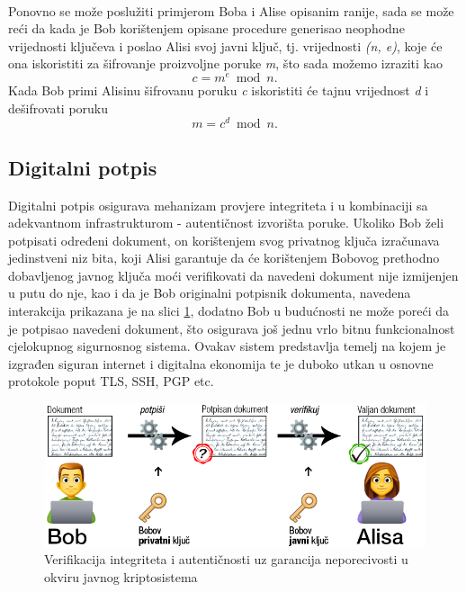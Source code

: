 \paragraph*{}
Ponovno se može poslužiti primjerom Boba i Alise opisanim ranije, sada se može reći da kada je Bob korištenjem opisane procedure generisao neophodne vrijednosti ključeva i poslao Alisi svoj javni ključ, tj. vrijednosti \textit{(n, e)}, koje će ona iskoristiti za šifrovanje proizvoljne poruke \textit{m}, što sada možemo izraziti kao \[c = m^e\bmod n.\] Kada Bob primi Alisinu šifrovanu poruku \textit{c} iskoristiti će tajnu vrijednost \textit{d} i dešifrovati poruku \[m = c^d\bmod n.\]

\subsection{Digitalni potpis} \label{subs:dsig}
Digitalni potpis osigurava mehanizam provjere integriteta i u kombinaciji sa adekvantnom infrastrukturom - autentičnost izvorišta poruke. Ukoliko Bob želi potpisati određeni dokument, on korištenjem svog privatnog ključa izračunava jedinstveni niz bita, koji Alisi garantuje da će korištenjem Bobovog prethodno dobavljenog javnog ključa moći verifikovati da navedeni dokument nije izmijenjen u putu do nje, kao i da je Bob originalni potpisnik dokumenta, navedena interakcija prikazana je na slici \ref{fig:alice_bob_sig}, dodatno Bob u budućnosti ne može poreći da je potpisao navedeni dokument, što osigurava još jednu vrlo bitnu funkcionalnost cjelokupnog sigurnosnog sistema. Ovakav sistem predstavlja temelj na kojem je izgrađen siguran internet i digitalna ekonomija te je duboko utkan u osnovne protokole poput TLS, SSH, PGP etc.\cite{dierks2008transport}

\begin{figure}[H]
    \centering
    \includegraphics[width=1.0\textwidth]{material/bob_alice_sig}
    \caption{Verifikacija integriteta i autentičnosti uz garancija neporecivosti u okviru javnog kriptosistema}
    \label{fig:alice_bob_sig}
\end{figure}

